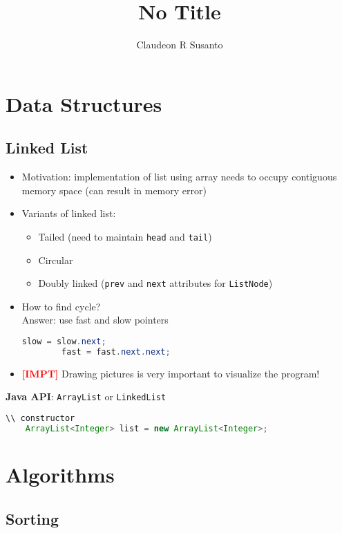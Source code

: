 \documentclass{article}
\title{No Title}
\author{Claudeon R Susanto}
\date{}
\newcommand{\impt}[0]{\textcolor{red}{\textbf{[IMPT] }}}
\begin{document}
{}\selectfont
\begin{multicols}{2}
\section{Data Structures}
\subsection{Linked List}
\begin{itemize}
	\item Motivation: implementation of list using array needs to occupy contiguous memory space (can result in memory error)
	\item Variants of linked list:
	\begin{itemize}
		\item Tailed (need to maintain \texttt{head} and \texttt{tail})
		\item Circular
		\item Doubly linked (\texttt{prev} and \texttt{next} attributes for \texttt{ListNode})
	\end{itemize}
	\item How to find cycle?\\
	Answer: use fast and slow pointers
	\begin{lstlisting}[language=java]
		slow = slow.next;
		fast = fast.next.next;\end{lstlisting}
	\item \impt Drawing pictures is very important to visualize the program!
\end{itemize}

\textbf{Java API}: \texttt{ArrayList} or \texttt{LinkedList}
\begin{lstlisting}[language=Java]
	\\ constructor
	ArrayList<Integer> list = new ArrayList<Integer>;
\end{lstlisting}

\section{Algorithms}
\subsection{Sorting}



\end{multicols}
\end{document}
